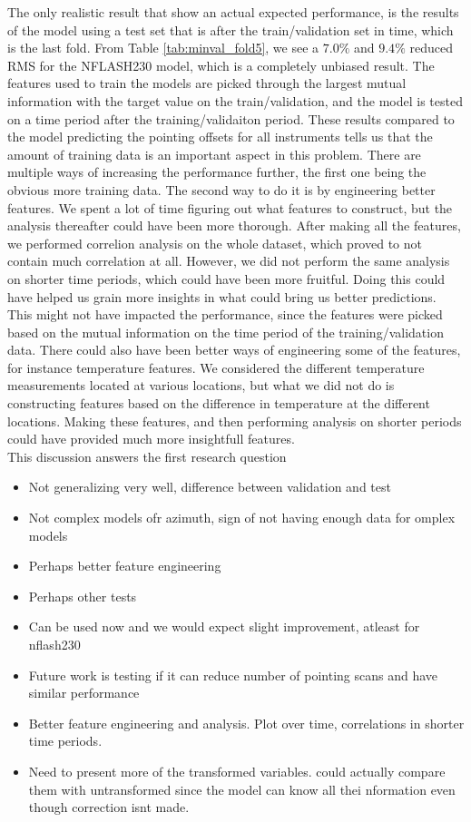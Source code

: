 The only realistic result that show an actual expected performance,
is the results of the model using a test set that is after the train/validation set in time, which is the last fold.
From Table \ref{tab:minval_fold5}, we see a $7.0\%$ and $9.4\%$ reduced RMS for the NFLASH230 model, which is a completely unbiased result.
The features used to train the models are picked through the largest mutual information with the target value on the train/validation,
and the model is tested on a time period after the training/validaiton period.
These results compared to the model predicting the pointing offsets for all instruments tells us that the amount of training data is an important aspect in this problem.
There are multiple ways of increasing the performance further, the first one being the obvious more training data. 
The second way to do it is by engineering better features.
We spent a lot of time figuring out what features to construct, but the analysis thereafter could have been more thorough.
After making all the features, we performed correlion analysis on the whole dataset, which proved to not contain much correlation at all.
However, we did not perform the same analysis on shorter time periods, which could have been more fruitful.
Doing this could have helped us grain more insights in what could bring us better predictions.
This might not have impacted the performance, since the features were picked based on the mutual information on the time period of the training/validation data.
There could also have been better ways of engineering some of the features, for instance temperature features.
We considered the different temperature measurements located at various locations,
but what we did not do is constructing features based on the difference in temperature at the different locations.
Making these features, and then performing analysis on shorter periods could have provided much more insightfull features.\\
This discussion answers the first research question






\begin{itemize}
    \item Not generalizing very well, difference between validation and test
    \item Not complex models ofr azimuth, sign of not having enough data for omplex models
    \item Perhaps better feature engineering
    \item Perhaps other tests
    \item Can be used now and we would expect slight improvement, atleast for nflash230
    \item Future work is testing if it can reduce number of pointing scans and have similar performance
    \item Better feature engineering and analysis. Plot over time, correlations in shorter time periods.
    \item Need to present more of the transformed variables. could actually compare them with untransformed since the model can know all thei nformation even though correction isnt made.
\end{itemize}

